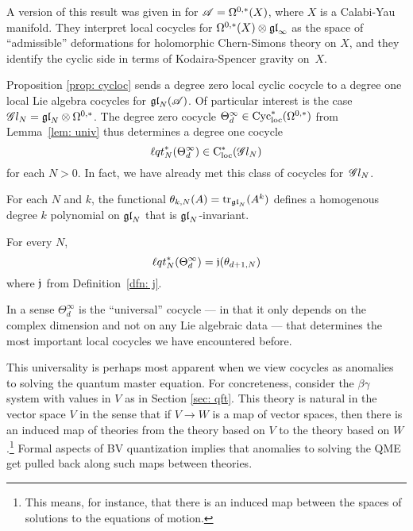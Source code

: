 \begin{rmk}
A version of this result was given in \cite{CL1} for $\mathscr A = \Omega^{0,*}(X)$, 
where $X$ is a Calabi-Yau manifold.
They interpret local cocycles for $\Omega^{0,*}(X) \otimes {\mathfrak{gl}}_\infty$ as the space of ``admissible'' deformations for holomorphic Chern-Simons theory on $X$,
and they identify the cyclic side in terms of Kodaira-Spencer gravity on~$X$.
\end{rmk}

Proposition \ref{prop: cycloc} sends a degree zero local cyclic cocycle to a degree one local Lie algebra cocycles for ${\mathfrak{gl}}_N(\mathscr A)$.
Of particular interest is the case $\mathscr G l_{N} = {\mathfrak{gl}}_N \otimes \Omega^{0,*}$. 
The degree zero cocycle $\Theta_d^\infty \in {\rm Cyc}_{\rm loc}^*(\Omega^{0,*})$ from Lemma~\ref{lem: univ} thus determines a degree one cocycle 
\[
{\ell q t}^*_N(\Theta_d^\infty) \in {\rm C}_{\rm loc}^*(\mathscr G l_N)
\]
for each $N > 0$. 
In fact, we have already met this class of cocycles for~$\mathscr G l_{N}$. 

\begin{dfn}
For each $N$ and $k$, the functional $\theta_{k,N}(A) = {\rm tr}_{{\mathfrak{gl}}_N} (A^k)$ defines a homogenous degree $k$ polynomial on ${\mathfrak{gl}}_N$ that is ${\mathfrak{gl}}_N$-invariant.
\end{dfn}

\begin{lem}
\label{lem:pullbackofthetainfinity}
For every $N$, 
\[
{\ell q t}_N^*(\Theta_d^\infty) = \mathfrak j(\theta_{d+1, N})
\]
where $\mathfrak j$ from Definition~\ref{dfn: j}.
\end{lem}

In a sense $\Theta^\infty_d$ is the ``universal'' cocycle --- in that it only depends on the complex dimension and not on any Lie algebraic data --- that determines the most important local cocycles we have encountered before.

This universality is perhaps most apparent when we view cocycles as anomalies to solving the quantum master equation. 
For concreteness, consider the $\beta\gamma$ system with values in $V$ as in Section \ref{sec: qft}.
This theory is natural in the vector space $V$ in the sense that if $V \to W$ is a map of vector spaces, then there is an induced map of theories from the theory based on $V$ to the theory based on $W$.\footnote{This means, for instance, that there is an induced map between the spaces of solutions to the equations of motion.}
Formal aspects of BV quantization implies that anomalies to solving the QME get pulled back along such maps between theories. 

